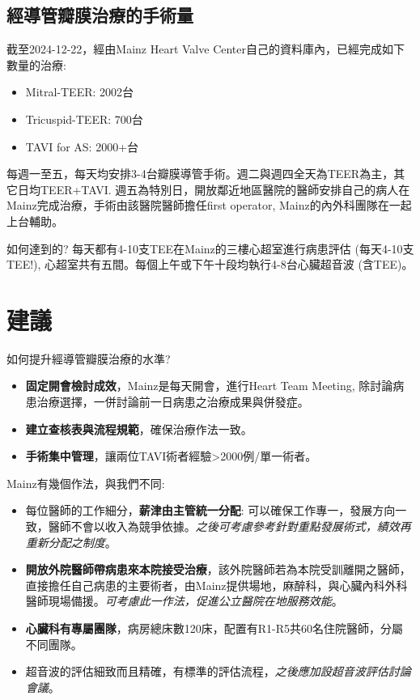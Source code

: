 \documentclass[nols]{tufte-book}
\begin{document}
\subsection{經導管瓣膜治療的手術量}
截至2024-12-22，經由Mainz Heart Valve Center自己的資料庫內，已經完成如下數量的治療:
\begin{itemize}
    \item Mitral-TEER: 2002台
    \item Tricuspid-TEER: 700台
    \item TAVI for AS: 2000+台
\end{itemize}

每週一至五，每天均安排3-4台瓣膜導管手術。週二與週四全天為TEER為主，其它日均TEER+TAVI. 週五為特別日，開放鄰近地區醫院的醫師安排自己的病人在Mainz完成治療，手術由該醫院醫師擔任first operator, Mainz的內外科團隊在一起上台輔助。

如何達到的? 每天都有4-10支TEE在Mainz的三樓心超室進行病患評估 (每天4-10支TEE!), 心超室共有五間。每個上午或下午十段均執行4-8台心臟超音波 (含TEE)。


\section{建議}
如何提升經導管瓣膜治療的水準?
\begin{itemize}
    \item \textbf{固定開會檢討成效}，Mainz是每天開會，進行Heart Team Meeting, 除討論病患治療選擇，一併討論前一日病患之治療成果與併發症。
    \item \textbf{建立查核表與流程規範}，確保治療作法一致。
    \item \textbf{手術集中管理}，讓兩位TAVI術者經驗>2000例/單一術者。
\end{itemize}

Mainz有幾個作法，與我們不同:
\begin{itemize}
    \item 每位醫師的工作細分，\textbf{薪津由主管統一分配}: 可以確保工作專一，發展方向一致，醫師不會以收入為競爭依據。\textit{之後可考慮參考針對重點發展術式，績效再重新分配之制度}。
    \item \textbf{開放外院醫師帶病患來本院接受治療}，該外院醫師若為本院受訓離開之醫師，直接擔任自己病患的主要術者，由Mainz提供場地，麻醉科，與心臟內科外科醫師現場備援。\textit{可考慮此一作法，促進公立醫院在地服務效能}。
    \item \textbf{心臟科有專屬團隊}，病房總床數120床，配置有R1-R5共60名住院醫師，分屬不同團隊。
    \item 超音波的評估細致而且精確，有標準的評估流程，\textit{之後應加設超音波評估討論會議}。
\end{itemize}
\end{document}
